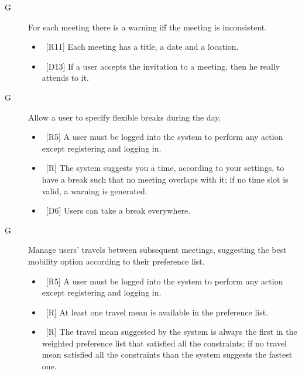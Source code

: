 \begin{description}
\item[G\thecountGoal]For each meeting there is a warning iff the meeting is inconsistent.

\begin{itemize}
\item~[R11] Each meeting has a title, a date and a location.
\end{itemize}

\begin{itemize}
\item~[D13] If a user accepts the invitation to a meeting, then he really attends to it.
\end{itemize}

\item[G\thecountGoal] Allow a user to specify flexible breaks during the day.

\begin{itemize}
\item~[R5] A user must be logged into the system to perform any action except registering and logging in.
\item~[R\reqNum] The system suggests you a time, according to your settings, to have a break such that no meeting overlaps with it; if no time slot is valid, a warning is generated.
\end{itemize}

\begin{itemize}
\item~[D6] Users can take a break everywhere.
\end{itemize}

\item[G\thecountGoal] Manage users’ travels between subsequent meetings, suggesting the best mobility option according to their preference list.

\begin{itemize}
\item~[R5] A user must be logged into the system to perform any action except registering and logging in.
\item~[R\reqNum] At least one travel mean is available in the preference list.
\item~[R\reqNum] The travel mean suggested by the system is always the first in the weighted preference list that satisfied all the constraints; if no travel mean satisfied all the constraints than the system suggests the fastest one.
\end{itemize}


\end{description}
